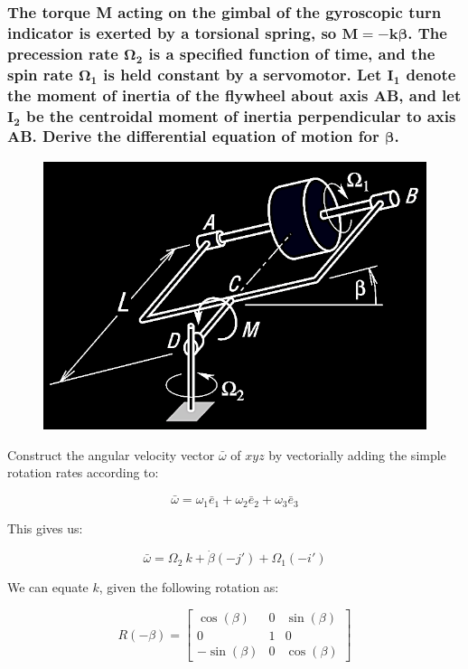 \documentclass[12pt, letterpaper]{../assignment}
\begin{document}
\subsubsection*{The torque M acting on the gimbal of the gyroscopic turn indicator is exerted by a torsional spring, so $\bm{M = -k\beta}$.
The precession rate $\bm{\Omega_2}$ is a specified function of time,
and the spin rate $\bm{\Omega_1}$ is held constant by a servomotor.
Let $\bm{I_1}$ denote the moment of inertia of the flywheel about axis AB,
and let $\bm{I_2}$ be the centroidal moment of inertia perpendicular to axis AB.
Derive the differential equation of motion for $\bm{\beta}$.}

\begin{figure}[H]
    \centering
    \includegraphics[scale=0.7,frame]{images/Q6_8.png}
\end{figure}


Construct the angular velocity vector $\bar{\omega}$ of $xyz$ by vectorially adding the simple rotation rates according to:

$$ \bar{\omega} = \omega_1 \bar{e}_1 + \omega_2 \bar{e}_2 + \omega_3 \bar{e}_3$$

This gives us:

$$ \bar{\omega} = \Omega_2\ k + \dot{\beta}(-j')
                + \Omega_1 (-i') $$

We can equate $k$, given the following rotation as:

$$ R(-\beta) = \left[\begin{array}{ccc} \cos\left(\beta \right) & 0 & \sin\left(\beta \right)\\ 0 & 1 & 0\\ -\sin\left(\beta \right) & 0 & \cos\left(\beta \right) \end{array}\right] $$
\end{document}

